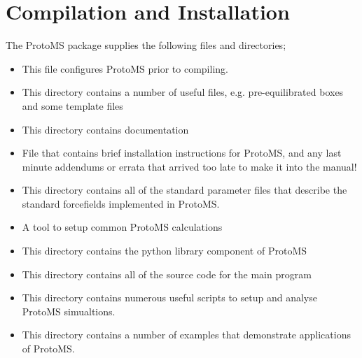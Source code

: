 \documentclass[letterpaper,10pt,english]{sphinxmanual}
\begin{document}
\chapter{Compilation and Installation}
\label{\detokenize{compilation:compilation-and-installation}}\label{\detokenize{compilation::doc}}
The ProtoMS package supplies the following files and directories;
\begin{itemize}
\item {} 
 This file configures ProtoMS prior to compiling.

\item {} 
 This directory contains a number of useful files, e.g. pre-equilibrated boxes and some template files

\item {} 
 This directory contains documentation

\item {} 
 File that contains brief installation instructions for ProtoMS, and any last minute addendums or errata that arrived too late to make it into the manual!

\item {} 
 This directory contains all of the standard parameter files that describe the standard forcefields implemented in ProtoMS.

\item {} 
 A tool to setup common ProtoMS calculations

\item {} 
 This directory contains the python library component of ProtoMS

\item {} 
 This directory contains all of the source code for the main program

\item {} 
 This directory contains numerous useful scripts to setup and analyse ProtoMS simualtions.

\item {} 
 This directory contains a number of examples that demonstrate applications of ProtoMS.

\end{itemize}
\end{document}
